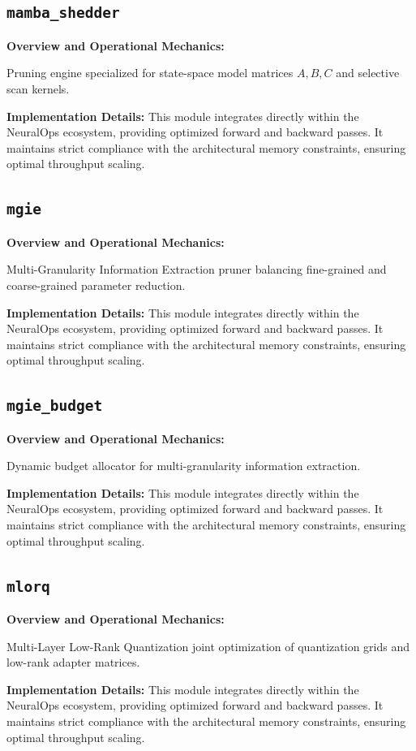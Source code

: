 \documentclass[10pt,twocolumn,letterpaper]{article}
\begin{document}
\subsection{\texttt{mamba\_shedder}}
\textbf{Overview and Operational Mechanics:}

Pruning engine specialized for state-space model matrices $A, B, C$ and selective scan kernels.

\textbf{Implementation Details:}
This module integrates directly within the NeuralOps ecosystem, providing optimized forward and backward passes. It maintains strict compliance with the architectural memory constraints, ensuring optimal throughput scaling.

\subsection{\texttt{mgie}}
\textbf{Overview and Operational Mechanics:}

Multi-Granularity Information Extraction pruner balancing fine-grained and coarse-grained parameter reduction.

\textbf{Implementation Details:}
This module integrates directly within the NeuralOps ecosystem, providing optimized forward and backward passes. It maintains strict compliance with the architectural memory constraints, ensuring optimal throughput scaling.

\subsection{\texttt{mgie\_budget}}
\textbf{Overview and Operational Mechanics:}

Dynamic budget allocator for multi-granularity information extraction.

\textbf{Implementation Details:}
This module integrates directly within the NeuralOps ecosystem, providing optimized forward and backward passes. It maintains strict compliance with the architectural memory constraints, ensuring optimal throughput scaling.

\subsection{\texttt{mlorq}}
\textbf{Overview and Operational Mechanics:}

Multi-Layer Low-Rank Quantization joint optimization of quantization grids and low-rank adapter matrices.

\textbf{Implementation Details:}
This module integrates directly within the NeuralOps ecosystem, providing optimized forward and backward passes. It maintains strict compliance with the architectural memory constraints, ensuring optimal throughput scaling.
\end{document}
